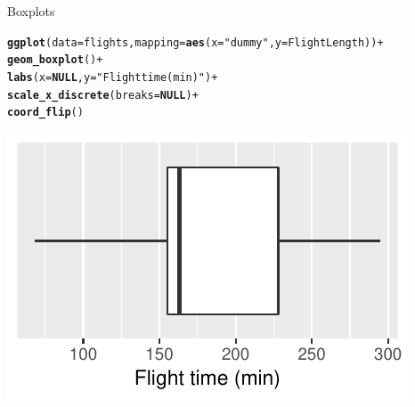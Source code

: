 \documentclass[10pt]{beamer}\usepackage[]{graphicx}\usepackage[]{color}
\makeatletter
\def\maxwidth{ %
  \ifdim\Gin@nat@width>\linewidth
    \linewidth
  \else
    \Gin@nat@width
  \fi
}
\newcommand{\hlstr}[1]{\textcolor[rgb]{0.192,0.494,0.8}{#1}}%
\newcommand{\hlopt}[1]{\textcolor[rgb]{0,0,0}{#1}}%
\newcommand{\hlstd}[1]{\textcolor[rgb]{0.345,0.345,0.345}{#1}}%
\newcommand{\hlkwa}[1]{\textcolor[rgb]{0.161,0.373,0.58}{\textbf{#1}}}%
\newcommand{\hlkwc}[1]{\textcolor[rgb]{0.333,0.667,0.333}{#1}}%
\newcommand{\hlkwd}[1]{\textcolor[rgb]{0.737,0.353,0.396}{\textbf{#1}}}%
\newenvironment{kframe}{%
 \def\at@end@of@kframe{}%
 \ifinner\ifhmode%
  \def\at@end@of@kframe{\end{minipage}}%
  \begin{minipage}{\columnwidth}%
 \fi\fi%
 \def\FrameCommand##1{\hskip\@totalleftmargin \hskip-\fboxsep
 \colorbox{shadecolor}{##1}\hskip-\fboxsep
     \hskip-\linewidth \hskip-\@totalleftmargin \hskip\columnwidth}%
 \MakeFramed {\advance\hsize-\width
   \@totalleftmargin\z@ \linewidth\hsize
   \@setminipage}}%
 {\par\unskip\endMakeFramed%
 \at@end@of@kframe}
\newenvironment{knitrout}{}{} %
\makeatother
\begin{document}
\begin{frame}[fragile]{Boxplots}

\begin{knitrout}\scriptsize
{}\color{fgcolor}\begin{kframe}
\begin{alltt}
\hlkwd{ggplot}\hlstd{(}\hlkwc{data} \hlstd{= flights,} \hlkwc{mapping} \hlstd{=} \hlkwd{aes}\hlstd{(}\hlkwc{x} \hlstd{=} \hlstr{"dummy"}\hlstd{,} \hlkwc{y} \hlstd{= FlightLength))} \hlopt{+}
  \hlkwd{geom_boxplot}\hlstd{()} \hlopt{+}
  \hlkwd{labs}\hlstd{(}\hlkwc{x} \hlstd{=} \hlkwa{NULL}\hlstd{,} \hlkwc{y} \hlstd{=} \hlstr{"Flight time (min)"}\hlstd{)} \hlopt{+}
  \hlkwd{scale_x_discrete}\hlstd{(}\hlkwc{breaks} \hlstd{=} \hlkwa{NULL}\hlstd{)} \hlopt{+}
  \hlkwd{coord_flip}\hlstd{()}
\end{alltt}
\end{kframe}
\includegraphics[width=\maxwidth]{figure/unnamed-chunk-20-1} 

\end{knitrout}

\end{frame}
\end{document}
